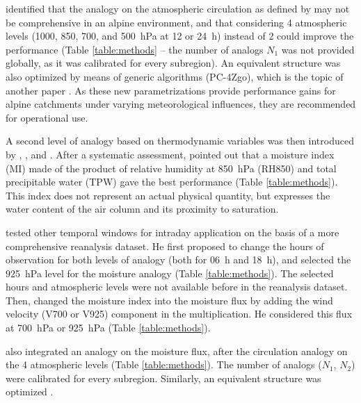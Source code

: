 \documentclass[review]{elsarticle}
\begin{document}
\citet{Horton2012} identified that the analogy on the atmospheric circulation as defined by \citet{Bontron2004} may not be comprehensive in an alpine environment, and that considering 4 atmospheric levels (1000, 850, 700, and 500~hPa at 12 or 24~h) instead of 2 could improve the performance (Table \ref{table:methods} -- the number of analogs $N_{1}$ was not provided globally, as it was calibrated for every subregion). An equivalent structure was also optimized by means of generic algorithms (PC-4Zgo), which is the topic of another paper \citep{Horton2016b}. As these new parametrizations provide performance gains for alpine catchments under varying meteorological influences, they are recommended for operational use.

A second level of analogy based on thermodynamic variables was then introduced by \citet{Mandon1985}, \citet{Vallee1986}, and \citet{Gibergans-Baguena2007}. After a systematic assessment, \citet{Bontron2004} pointed out that a moisture index (MI) made of the product of relative humidity at 850~hPa (RH850) and total precipitable water (TPW) gave the best performance (Table \ref{table:methods}). This index does not represent an actual physical quantity, but expresses the water content of the air column and its proximity to saturation.

\citet{Marty2010} tested other temporal windows for intraday application on the basis of a more comprehensive reanalysis dataset. He first proposed to change the hours of observation for both levels of analogy (both for 06~h and 18~h), and selected the 925~hPa level for the moisture analogy (Table \ref{table:methods}). The selected hours and atmospheric levels were not available before in the reanalysis dataset. Then, \citet{Marty2010} changed the moisture index into the moisture flux by adding the wind velocity (V700 or V925) component in the multiplication. He considered this flux at 700~hPa or 925~hPa (Table \ref{table:methods}).

\citet{Horton2012} also integrated an analogy on the moisture flux, after the circulation analogy on the 4 atmospheric levels (Table \ref{table:methods}). The number of analogs ($N_{1}$, $N_{2}$) were calibrated for every subregion. Similarly, an equivalent structure was optimized \citep[PC-4Zgo-2MIgo,][]{Horton2016b}. 
\end{document}
